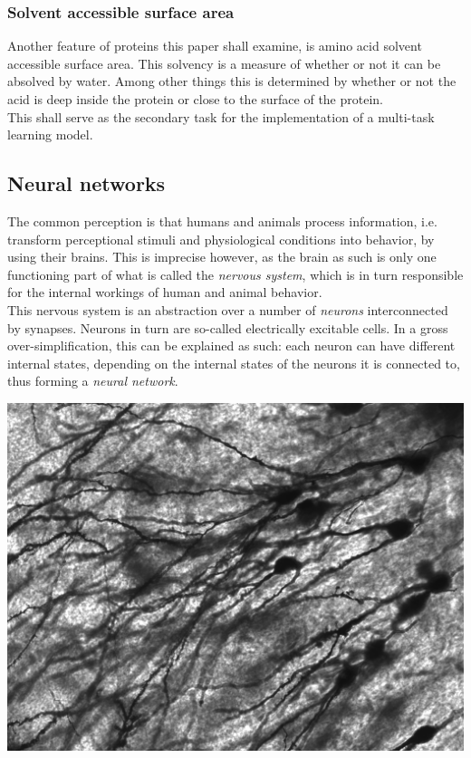 \subsubsection{Solvent accessible surface area}
Another feature of proteins this paper shall examine, is amino acid solvent accessible surface area. This solvency is a measure of whether or not it can be absolved by water. Among other things this is determined by whether or not the acid is deep inside the protein or close to the surface of the protein. \\
This shall serve as the secondary task for the implementation of a multi-task learning model.

\subsection{Neural networks}
The common perception is that humans and animals process information, i.e. transform perceptional 
stimuli and physiological conditions into behavior, by using their brains. This is imprecise 
however, as the brain as such is only one functioning part of what is called the \textit{nervous 
system}, which is in turn responsible for the internal workings of human and animal behavior.\\
This nervous system is an abstraction over a number of \textit{neurons} interconnected by 
synapses. Neurons in turn are so-called electrically excitable cells. In a gross over-simplification, this can be explained as such: each neuron can have different internal states, depending on the internal states of the neurons it is connected to, thus forming a \textit{neural network}.


\begin{Figure}
 \centering
 \includegraphics[width=0.8\linewidth]{images/Gyrus_Dentatus_40x}
 \captionsetup{width=0.8\linewidth, font=small}
\end{Figure}

